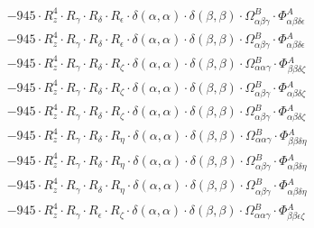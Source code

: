 \documentclass{article}
\begin{document}
\begin{subequations}
\begin{gather}
\begin{array}{c}
 \\[0.2em] 		 - 945 \cdot R_{z}^{4} \cdot R_{\gamma{}} \cdot R_{\delta{}} \cdot R_{\epsilon{}} \cdot \delta{}\left(\alpha{}, \alpha{}\right) \cdot \delta{}\left(\beta{}, \beta{}\right) \cdot \Omega{}^{B}_{\alpha{}\beta{}\gamma{}} \cdot \Phi{}^{A}_{\alpha{}\beta{}\delta{}\epsilon{}} 
 \\[0.2em] 		 - 945 \cdot R_{z}^{4} \cdot R_{\gamma{}} \cdot R_{\delta{}} \cdot R_{\epsilon{}} \cdot \delta{}\left(\alpha{}, \alpha{}\right) \cdot \delta{}\left(\beta{}, \beta{}\right) \cdot \Omega{}^{B}_{\alpha{}\beta{}\gamma{}} \cdot \Phi{}^{A}_{\alpha{}\beta{}\delta{}\epsilon{}} 
 \\[0.2em] 		 - 945 \cdot R_{z}^{4} \cdot R_{\gamma{}} \cdot R_{\delta{}} \cdot R_{\zeta{}} \cdot \delta{}\left(\alpha{}, \alpha{}\right) \cdot \delta{}\left(\beta{}, \beta{}\right) \cdot \Omega{}^{B}_{\alpha{}\alpha{}\gamma{}} \cdot \Phi{}^{A}_{\beta{}\beta{}\delta{}\zeta{}} 
 \\[0.2em] 		 - 945 \cdot R_{z}^{4} \cdot R_{\gamma{}} \cdot R_{\delta{}} \cdot R_{\zeta{}} \cdot \delta{}\left(\alpha{}, \alpha{}\right) \cdot \delta{}\left(\beta{}, \beta{}\right) \cdot \Omega{}^{B}_{\alpha{}\beta{}\gamma{}} \cdot \Phi{}^{A}_{\alpha{}\beta{}\delta{}\zeta{}} 
 \\[0.2em] 		 - 945 \cdot R_{z}^{4} \cdot R_{\gamma{}} \cdot R_{\delta{}} \cdot R_{\zeta{}} \cdot \delta{}\left(\alpha{}, \alpha{}\right) \cdot \delta{}\left(\beta{}, \beta{}\right) \cdot \Omega{}^{B}_{\alpha{}\beta{}\gamma{}} \cdot \Phi{}^{A}_{\alpha{}\beta{}\delta{}\zeta{}} 
 \\[0.2em] 		 - 945 \cdot R_{z}^{4} \cdot R_{\gamma{}} \cdot R_{\delta{}} \cdot R_{\eta{}} \cdot \delta{}\left(\alpha{}, \alpha{}\right) \cdot \delta{}\left(\beta{}, \beta{}\right) \cdot \Omega{}^{B}_{\alpha{}\alpha{}\gamma{}} \cdot \Phi{}^{A}_{\beta{}\beta{}\delta{}\eta{}} 
 \\[0.2em] 		 - 945 \cdot R_{z}^{4} \cdot R_{\gamma{}} \cdot R_{\delta{}} \cdot R_{\eta{}} \cdot \delta{}\left(\alpha{}, \alpha{}\right) \cdot \delta{}\left(\beta{}, \beta{}\right) \cdot \Omega{}^{B}_{\alpha{}\beta{}\gamma{}} \cdot \Phi{}^{A}_{\alpha{}\beta{}\delta{}\eta{}} 
 \\[0.2em] 		 - 945 \cdot R_{z}^{4} \cdot R_{\gamma{}} \cdot R_{\delta{}} \cdot R_{\eta{}} \cdot \delta{}\left(\alpha{}, \alpha{}\right) \cdot \delta{}\left(\beta{}, \beta{}\right) \cdot \Omega{}^{B}_{\alpha{}\beta{}\gamma{}} \cdot \Phi{}^{A}_{\alpha{}\beta{}\delta{}\eta{}} 
 \\[0.2em] 		 - 945 \cdot R_{z}^{4} \cdot R_{\gamma{}} \cdot R_{\epsilon{}} \cdot R_{\zeta{}} \cdot \delta{}\left(\alpha{}, \alpha{}\right) \cdot \delta{}\left(\beta{}, \beta{}\right) \cdot \Omega{}^{B}_{\alpha{}\alpha{}\gamma{}} \cdot \Phi{}^{A}_{\beta{}\beta{}\epsilon{}\zeta{}} 

\end{array}
\end{gather}
\end{subequations}
\end{document}
